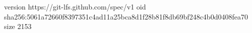 version https://git-lfs.github.com/spec/v1
oid sha256:5061a72660f8397351c4ad11a25bca8d1f28b81f8db69bf248c4b0d0408fea70
size 2153
